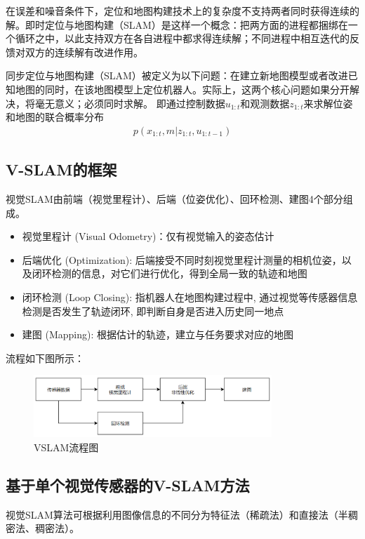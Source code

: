 \documentclass[cs4size,a4paper]{ctexart}
\numberwithin{equation}{section}
\numberwithin{table}{section}
\numberwithin{figure}{section}
\begin{document}
在误差和噪音条件下，定位和地图构建技术上的复杂度不支持两者同时获得连续的解。即时定位与地图构建（SLAM）是这样一个概念：把两方面的进程都捆绑在一个循环之中，以此支持双方在各自进程中都求得连续解；不同进程中相互迭代的反馈对双方的连续解有改进作用。

同步定位与地图构建（SLAM）被定义为以下问题：在建立新地图模型或者改进已知地图的同时，在该地图模型上定位机器人。实际上，这两个核心问题如果分开解决，将毫无意义；必须同时求解。
即通过控制数据$u_{1:t}$和观测数据$z_{1:t}$来求解位姿和地图的联合概率分布
\begin{align}
    p\left(x_{1: t}, m | z_{1: t}, u_{1: t-1}\right)
\end{align}

\subsection{V-SLAM的框架}
视觉SLAM由前端（视觉里程计）、后端（位姿优化）、回环检测、建图4个部分组成。
\begin{itemize}
        \item  视觉里程计 (Visual Odometry)：仅有视觉输入的姿态估计\cite{1315094}
        \item 后端优化 (Optimization): 后端接受不同时刻视觉里程计测量的相机位姿，以及闭环检测的信息，对它们进行优化，得到全局一致的轨迹和地图\cite{9787121311048}
        \item 闭环检测 (Loop Closing): 指机器人在地图构建过程中, 通过视觉等传感器信息检测是否发生了轨迹闭环, 即判断自身是否进入历史同一地点\cite{9787121311048}
        \item  建图 (Mapping): 根据估计的轨迹，建立与任务要求对应的地图\cite{9787121311048}
\end{itemize}
流程如下图所示：

    \begin{figure}[H]
        \centering
        \includegraphics[width=0.8\textwidth]{figure/framework.png}
        \caption{VSLAM流程图\cite{9787121311048}}
    \end{figure}
    
\subsection{基于单个视觉传感器的V-SLAM方法}
视觉SLAM算法可根据利用图像信息的不同分为特征法（稀疏法）和直接法（半稠密法、稠密法）。
\end{document}
